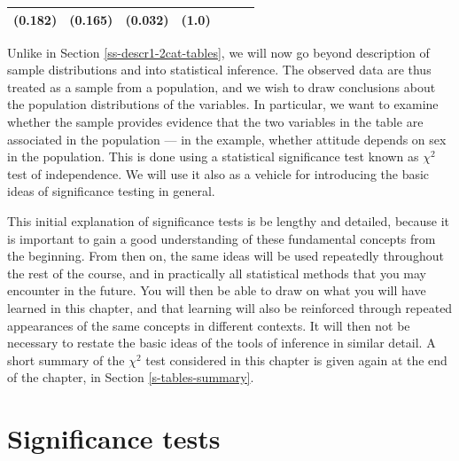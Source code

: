 \documentclass[11pt,a4paper,openany]{book}
\begin{document}
\begin{longtable}[]{@{}lclclcl@{}}
\begin{minipage}[t]{0.06\columnwidth}
(0.182)\strut
\end{minipage} & \begin{minipage}[t]{0.04\columnwidth}\raggedright\strut
(0.165)\strut
\end{minipage} & \begin{minipage}[t]{0.04\columnwidth}\centering\strut
(0.032)\strut
\end{minipage} & \begin{minipage}[t]{0.03\columnwidth}\raggedright\strut
(1.0)\strut
\end{minipage}\tabularnewline
\bottomrule
\end{longtable}

Unlike in Section \ref{ss-descr1-2cat-tables}, we will now go beyond
description of sample distributions and into statistical inference. The
observed data are thus treated as a sample from a population, and we
wish to draw conclusions about the population distributions of the
variables. In particular, we want to examine whether the sample provides
evidence that the two variables in the table are associated in the
population --- in the example, whether attitude depends on sex in the
population. This is done using a statistical significance test known as
\(\chi^{2}\) test of independence. We will use it also as a vehicle for
introducing the basic ideas of significance testing in general.

This initial explanation of significance tests is be lengthy and
detailed, because it is important to gain a good understanding of these
fundamental concepts from the beginning. From then on, the same ideas
will be used repeatedly throughout the rest of the course, and in
practically all statistical methods that you may encounter in the
future. You will then be able to draw on what you will have learned in
this chapter, and that learning will also be reinforced through repeated
appearances of the same concepts in different contexts. It will then not
be necessary to restate the basic ideas of the tools of inference in
similar detail. A short summary of the \(\chi^{2}\) test considered in
this chapter is given again at the end of the chapter, in Section
\ref{s-tables-summary}.

\section{Significance tests}\label{s-tables-tests}
\end{document}
